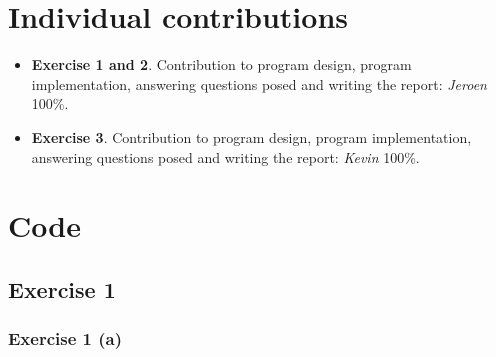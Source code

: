 \documentclass{article}
\begin{document}
\section*{Individual contributions}
\begin{itemize}
    \item \textbf{Exercise 1 and 2}. Contribution to program design, program implementation, answering questions posed and writing the report: \textit{Jeroen} 100\%.
    \item \textbf{Exercise 3}. Contribution to program design, program implementation, answering questions posed and writing the report: \textit{Kevin} 100\%.
\end{itemize}


\typeout{}


\newpage
\appendix
\section{Code}
\subsection{Exercise 1}
\subsubsection{Exercise 1 (a)}
\end{document}
